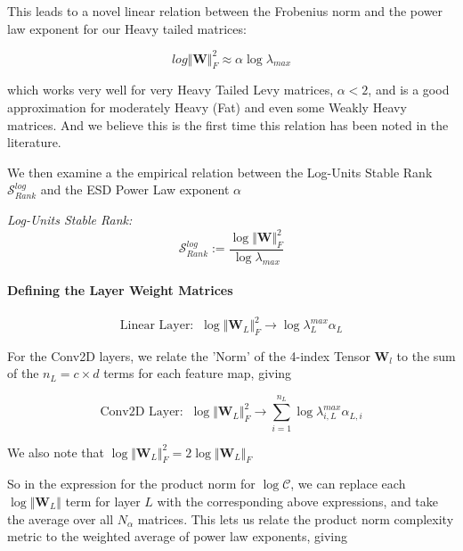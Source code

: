 This leads to a novel linear relation between the Frobenius norm and the power law exponent for our Heavy tailed matrices:

$$log\Vert\mathbf{W}\Vert^{2}_{F}\approx\alpha\log\lambda_{max}$$

which works very well for very Heavy Tailed Levy matrices, $\alpha<2$, and is a good approximation
for moderately Heavy (Fat) and even some Weakly Heavy matrices.  And we believe this is the first
time this relation has been noted in the literature.


We then examine a the empirical relation between  the Log-Units Stable Rank 
$\mathcal{S}^{log}_{Rank}$ and the ESD Power Law exponent $\alpha$

\emph{Log-Units Stable Rank:  } 
$$\mathcal{S}^{log}_{Rank}:=\dfrac{\log\Vert\mathbf{W}\Vert^{2}_{F}}{\log\lambda_{max}}$$



\paragraph{Defining the Layer Weight Matrices}

$$\text{Linear Layer:}\;\;\log\Vert\mathbf{W}_{L}\Vert^{2}_{F}\rightarrow\log\lambda^{max}_{L}\alpha_{L}$$

For the Conv2D layers, we relate the 'Norm' of the 4-index Tensor $\mathbf{W}_{l}$ to the sum of the $n_{L}=c\times d$ terms for each feature map, giving 

$$\text{Conv2D Layer:}\;\;\log\Vert\mathbf{W}_{L}\Vert^{2}_{F}\rightarrow \sum_{i=1}^{n_{L}}\log\lambda^{max}_{i,L}\alpha_{L,i}$$

We also note that $\log\Vert\mathbf{W}_{L}\Vert^{2}_{F}=2\log\Vert\mathbf{W}_{L}\Vert_{F}$ 

So in the expression for the product norm for $\log\mathcal{C}$, we can replace each $\log\Vert\mathbf{W}_{L}\Vert$ term for layer $L$ with the corresponding above expressions, and take the average over all $N_{\alpha}$  matrices.  This lets us relate the product norm complexity metric to the weighted average of power law exponents, giving

